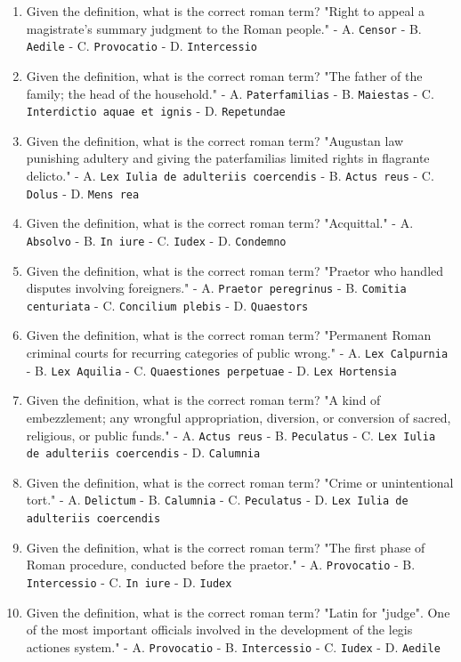 \documentclass[11pt]{article}
\begin{document}
\begin{enumerate}
\item Given the definition, what is the correct roman term? "Right to appeal a magistrate's summary judgment to the Roman people." - A. \texttt{Censor} - B. \texttt{Aedile} - C. \texttt{Provocatio} - D. \texttt{Intercessio}
\item Given the definition, what is the correct roman term? "The father of the family; the head of the household." - A. \texttt{Paterfamilias} - B. \texttt{Maiestas} - C. \texttt{Interdictio aquae et ignis} - D. \texttt{Repetundae}
\item Given the definition, what is the correct roman term? "Augustan law punishing adultery and giving the paterfamilias limited rights in flagrante delicto." - A. \texttt{Lex Iulia de adulteriis coercendis} - B. \texttt{Actus reus} - C. \texttt{Dolus} - D. \texttt{Mens rea}
\item Given the definition, what is the correct roman term? "Acquittal." - A. \texttt{Absolvo} - B. \texttt{In iure} - C. \texttt{Iudex} - D. \texttt{Condemno}
\item Given the definition, what is the correct roman term? "Praetor who handled disputes involving foreigners." - A. \texttt{Praetor peregrinus} - B. \texttt{Comitia centuriata} - C. \texttt{Concilium plebis} - D. \texttt{Quaestors}
\item Given the definition, what is the correct roman term? "Permanent Roman criminal courts for recurring categories of public wrong." - A. \texttt{Lex Calpurnia} - B. \texttt{Lex Aquilia} - C. \texttt{Quaestiones perpetuae} - D. \texttt{Lex Hortensia}
\item Given the definition, what is the correct roman term? "A kind of embezzlement; any wrongful appropriation, diversion, or conversion of sacred, religious, or public funds." - A. \texttt{Actus reus} - B. \texttt{Peculatus} - C. \texttt{Lex Iulia de adulteriis coercendis} - D. \texttt{Calumnia}
\item Given the definition, what is the correct roman term? "Crime or unintentional tort." - A. \texttt{Delictum} - B. \texttt{Calumnia} - C. \texttt{Peculatus} - D. \texttt{Lex Iulia de adulteriis coercendis}
\item Given the definition, what is the correct roman term? "The first phase of Roman procedure, conducted before the praetor." - A. \texttt{Provocatio} - B. \texttt{Intercessio} - C. \texttt{In iure} - D. \texttt{Iudex}
\item Given the definition, what is the correct roman term? "Latin for "judge". One of the most important officials involved in the development of the legis actiones system." - A. \texttt{Provocatio} - B. \texttt{Intercessio} - C. \texttt{Iudex} - D. \texttt{Aedile}

\end{enumerate}
\end{document}
